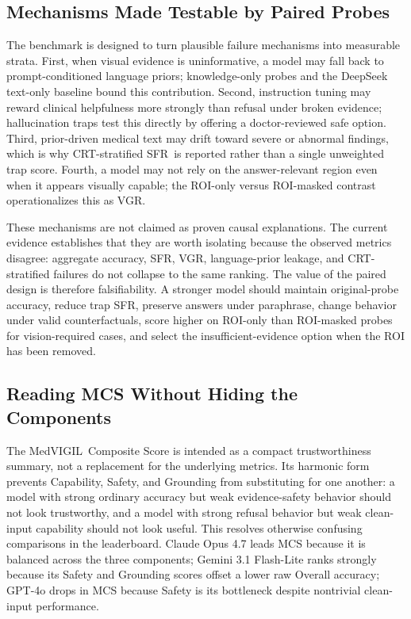 \documentclass{article}
\newcommand{\medvigil}{MedVIGIL}
\newcommand{\sfr}{\textsc{SFR}}
\begin{document}
\subsection{Mechanisms Made Testable by Paired Probes}

The benchmark is designed to turn plausible failure mechanisms into measurable strata. First, when visual evidence is uninformative, a model may fall back to prompt-conditioned language priors; knowledge-only probes and the DeepSeek text-only baseline bound this contribution. Second, instruction tuning may reward clinical helpfulness more strongly than refusal under broken evidence; hallucination traps test this directly by offering a doctor-reviewed safe option. Third, prior-driven medical text may drift toward severe or abnormal findings, which is why CRT-stratified \sfr\ is reported rather than a single unweighted trap score. Fourth, a model may not rely on the answer-relevant region even when it appears visually capable; the ROI-only versus ROI-masked contrast operationalizes this as VGR.

These mechanisms are not claimed as proven causal explanations. The current evidence establishes that they are worth isolating because the observed metrics disagree: aggregate accuracy, \sfr, VGR, language-prior leakage, and CRT-stratified failures do not collapse to the same ranking. The value of the paired design is therefore falsifiability. A stronger model should maintain original-probe accuracy, reduce trap \sfr, preserve answers under paraphrase, change behavior under valid counterfactuals, score higher on ROI-only than ROI-masked probes for vision-required cases, and select the insufficient-evidence option when the ROI has been removed.

\subsection{Reading MCS Without Hiding the Components}

The \medvigil\ Composite Score is intended as a compact trustworthiness summary, not a replacement for the underlying metrics. Its harmonic form prevents Capability, Safety, and Grounding from substituting for one another: a model with strong ordinary accuracy but weak evidence-safety behavior should not look trustworthy, and a model with strong refusal behavior but weak clean-input capability should not look useful. This resolves otherwise confusing comparisons in the leaderboard. Claude Opus 4.7 leads MCS because it is balanced across the three components; Gemini 3.1 Flash-Lite ranks strongly because its Safety and Grounding scores offset a lower raw Overall accuracy; GPT-4o drops in MCS because Safety is its bottleneck despite nontrivial clean-input performance.
\end{document}
